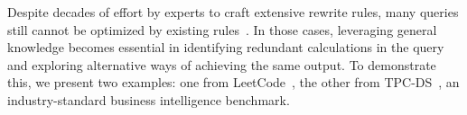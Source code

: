 Despite decades of effort by experts to craft extensive rewrite rules, many queries still cannot be optimized by existing rules~\cite{dong2023slabcity}. 
In those cases, leveraging general knowledge becomes essential in identifying redundant calculations in the query and exploring alternative ways of achieving the same output. 
To demonstrate this, we present two examples: one from LeetCode~\cite{gen_leetcode}, the other from TPC-DS~\cite{tpcds}, an industry-standard business intelligence benchmark.

